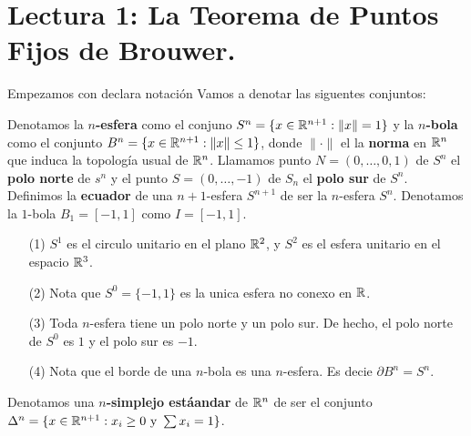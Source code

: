 \section*{Lectura 1: La Teorema de Puntos Fijos de Brouwer.}

Empezamos con declara notaci\'on Vamos a denotar las siguentes conjuntos:

\begin{definition}
    Denotamos la \textbf{$n$-esfera} como el conjuno $S^n=\{x \in
    \mathbb{R}^{n+1} : \|x\|=1\}$ y la \textbf{$n$-bola} como el conjunto $B^n=\{x
    \in \mathbb{R}^{n+1} : \|x\| \leq 1\}$, donde $\|\cdot\|$ el la \textbf{norma} en
    $\mathbb{R}^n$ que induca la topolog\'ia usual de $\mathbb{R}^n$. Llamamos punto
    $N=(0,\dots,0,1)$ de $S^n$ el \textbf{polo norte} de $s^n$ y el punto $S=(0,
    \dots, -1)$ de $S_n$ el  \textbf{polo sur} de $S^n$. Definimos la
    \textbf{ecuador} de una $n+1$-esfera $S^{n+1}$ de ser la $n$-esfera $S^n$.
    Denotamos la $1$-bola  $B_1=[-1,1]$ como $I=[-1,1]$.
\end{definition}

\begin{example}\label{exmp_1}
    \begin{enumerate}
        \item[(1)] $S^1$ es el circulo unitario en el plano $\mathbb{R}^2$, y  $S^2$ es
            el esfera unitario en el espacio $\mathbb{R}^3$.

        \item[(2)] Nota que $S^0=\{-1,1\}$ es la unica esfera no conexo en $\mathbb{R}$.

        \item[(3)] Toda $n$-esfera tiene un polo norte y un polo sur. De hecho,
            el polo norte de $S^0$ es $1$ y el polo sur es $-1$.

        \item[(4)] Nota que el borde de una $n$-bola es una  $n$-esfera. Es
            decie  $\partial{B^n}=S^n$.
    \end{enumerate}
\end{example}

\begin{definition}
    Denotamos una \textbf{$n$-simplejo est\'aandar} de $\mathbb{R}^n$ de ser el conjunto
    $\Delta^n=\{x \in \mathbb{R}^{n+1} : x_i \geq 0 \text{ y } \sum{x_i}=1\}$.
\end{definition}

